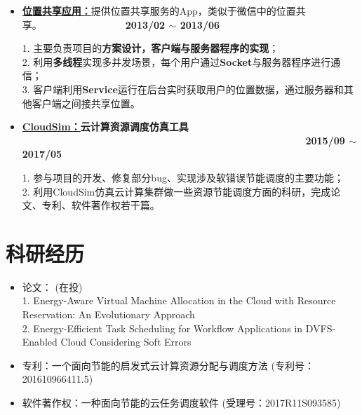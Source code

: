 \documentclass[letterpaper, UTF8, 11pt]{article}
\begin{document}
\begin{itemize}
		
		\item \textbf{\href{https://github.com/Hepsilion/MapProject}{位置共享应用：}}{提供位置共享服务的App，类似于微信中的位置共享。}~~~~~~~~~~~~~~~~~\textbf{2013/02 $\sim$ 2013/06}
		
		1. 主要负责项目的\textbf{方案设计，客户端与服务器程序的实现}；\\
		2. 利用\textbf{多线程}实现多并发场景，每个用户通过\textbf{Socket}与服务器程序进行通信；\\
		3. 客户端利用\textbf{Service}运行在后台实时获取用户的位置数据，通过服务器和其他客户端之间接共享位置。
		\vspace{0.03in}	
		
		\item \textbf{\href{https://github.com/Hepsilion/cloudsim}{CloudSim：}{云计算资源调度仿真工具}} ~~~~~~~~~~~~~~~~~~~~~~~~~~~~~~~~~~~~~~~~~~~~~~~~~~~~~~~~~ \textbf{2015/09 $\sim$ 2017/05}
		
		1. 参与项目的开发、修复部分bug、实现涉及软错误节能调度的主要功能；\\
		2. 利用CloudSim仿真云计算集群做一些资源节能调度方面的科研，完成论文、专利、软件著作权若干篇。
		\vspace{0.03in}	
	\end{itemize}
	\vspace{-0.32in}
	
	\section*{\textbf{科研经历}}\vspace{-0.15in}
	\begin{itemize}	
		\item \small 论文： (在投)\\
		1. Energy-Aware Virtual Machine Allocation in the Cloud with Resource Reservation: An Evolutionary Approach\\
		2. Energy-Efficient Task Scheduling for Workflow Applications in DVFS-Enabled Cloud Considering Soft Errors
		\item 专利：一个面向节能的启发式云计算资源分配与调度方法 (专利号：201610966411.5)
		\item 软件著作权：一种面向节能的云任务调度软件 (受理号：2017R11S093585)
	\end{itemize}
	\vspace{-0.3in}
	
\end{document}
